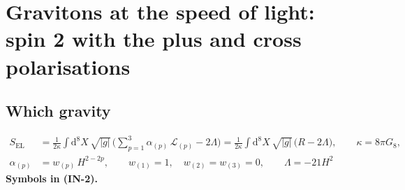 \documentclass[
  10pt,
]{article}
\begin{document}
\hypertarget{gravitons-at-the-speed-of-light-spin-2-with-the-plus-and-cross-polarisations}{%
\section{Gravitons at the speed of light: spin 2 with the plus and cross
polarisations}\label{gravitons-at-the-speed-of-light-spin-2-with-the-plus-and-cross-polarisations}}

\hypertarget{which-gravity}{%
\subsection{Which gravity}\label{which-gravity}}

\[
\begin{aligned}
S_{\mathrm{EL}} &= \frac{1}{2\kappa}\int\mathrm{d}^8X\,\sqrt{\lvert g\rvert}\,\Big(\sum_{p=1}^{3}\alpha_{(p)}\,\mathcal{L}_{(p)}
 - 2\Lambda\Big) = \frac{1}{2\kappa}\int\mathrm{d}^8X\,\sqrt{\lvert g\rvert}\,\big(R - 2\Lambda\big),\qquad \kappa = 8\pi G_8,\\
\alpha_{(p)} &= w_{(p)}\,H^{2-2p},\qquad w_{(1)} = 1,\quad w_{(2)} = w_{(3)} = 0,\qquad \Lambda = -21H^2
\end{aligned} \tag{IN-2}
\] \textbf{Symbols in (IN-2).}
\end{document}
